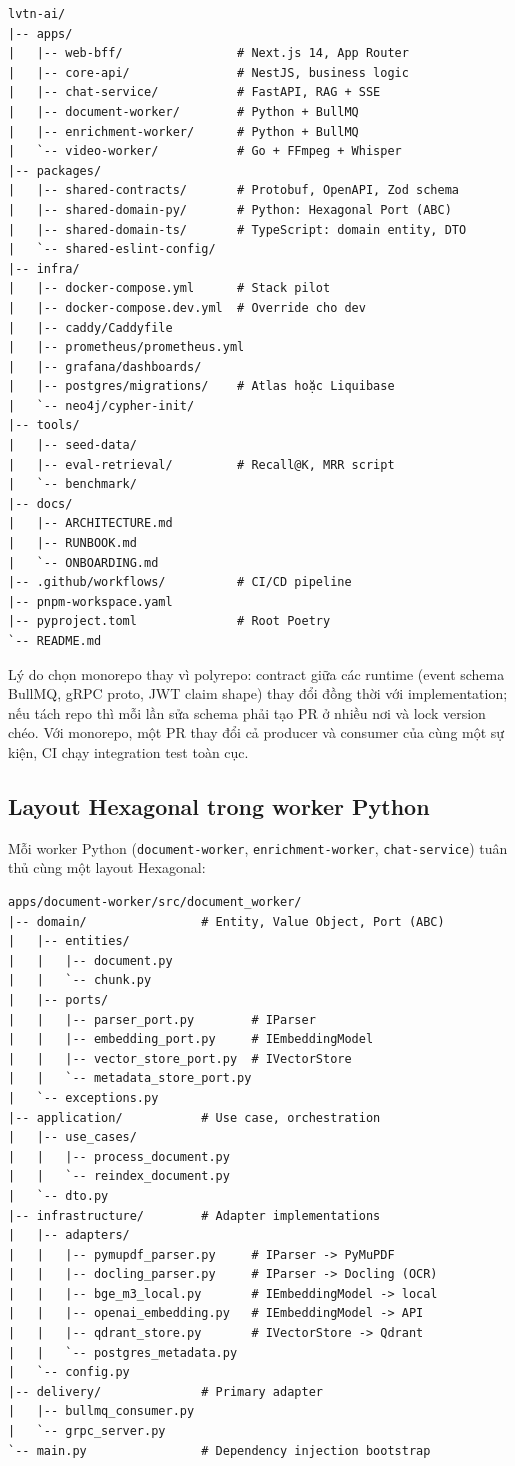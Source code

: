 \begin{verbatim}
lvtn-ai/
|-- apps/
|   |-- web-bff/                # Next.js 14, App Router
|   |-- core-api/               # NestJS, business logic
|   |-- chat-service/           # FastAPI, RAG + SSE
|   |-- document-worker/        # Python + BullMQ
|   |-- enrichment-worker/      # Python + BullMQ
|   `-- video-worker/           # Go + FFmpeg + Whisper
|-- packages/
|   |-- shared-contracts/       # Protobuf, OpenAPI, Zod schema
|   |-- shared-domain-py/       # Python: Hexagonal Port (ABC)
|   |-- shared-domain-ts/       # TypeScript: domain entity, DTO
|   `-- shared-eslint-config/
|-- infra/
|   |-- docker-compose.yml      # Stack pilot
|   |-- docker-compose.dev.yml  # Override cho dev
|   |-- caddy/Caddyfile
|   |-- prometheus/prometheus.yml
|   |-- grafana/dashboards/
|   |-- postgres/migrations/    # Atlas hoặc Liquibase
|   `-- neo4j/cypher-init/
|-- tools/
|   |-- seed-data/
|   |-- eval-retrieval/         # Recall@K, MRR script
|   `-- benchmark/
|-- docs/
|   |-- ARCHITECTURE.md
|   |-- RUNBOOK.md
|   `-- ONBOARDING.md
|-- .github/workflows/          # CI/CD pipeline
|-- pnpm-workspace.yaml
|-- pyproject.toml              # Root Poetry
`-- README.md
\end{verbatim}

Lý do chọn monorepo thay vì polyrepo: contract giữa các runtime (event
schema BullMQ, gRPC proto, JWT claim shape) thay đổi đồng thời với
implementation; nếu tách repo thì mỗi lần sửa schema phải tạo PR ở
nhiều nơi và lock version chéo. Với monorepo, một PR thay đổi cả
producer và consumer của cùng một sự kiện, CI chạy integration test
toàn cục.

\subsection{Layout Hexagonal trong worker Python}

Mỗi worker Python (\texttt{document-worker}, \texttt{enrichment-worker},
\texttt{chat-service}) tuân thủ cùng một layout Hexagonal:

\begin{verbatim}
apps/document-worker/src/document_worker/
|-- domain/                # Entity, Value Object, Port (ABC)
|   |-- entities/
|   |   |-- document.py
|   |   `-- chunk.py
|   |-- ports/
|   |   |-- parser_port.py        # IParser
|   |   |-- embedding_port.py     # IEmbeddingModel
|   |   |-- vector_store_port.py  # IVectorStore
|   |   `-- metadata_store_port.py
|   `-- exceptions.py
|-- application/           # Use case, orchestration
|   |-- use_cases/
|   |   |-- process_document.py
|   |   `-- reindex_document.py
|   `-- dto.py
|-- infrastructure/        # Adapter implementations
|   |-- adapters/
|   |   |-- pymupdf_parser.py     # IParser -> PyMuPDF
|   |   |-- docling_parser.py     # IParser -> Docling (OCR)
|   |   |-- bge_m3_local.py       # IEmbeddingModel -> local
|   |   |-- openai_embedding.py   # IEmbeddingModel -> API
|   |   |-- qdrant_store.py       # IVectorStore -> Qdrant
|   |   `-- postgres_metadata.py
|   `-- config.py
|-- delivery/              # Primary adapter
|   |-- bullmq_consumer.py
|   `-- grpc_server.py
`-- main.py                # Dependency injection bootstrap
\end{verbatim}

